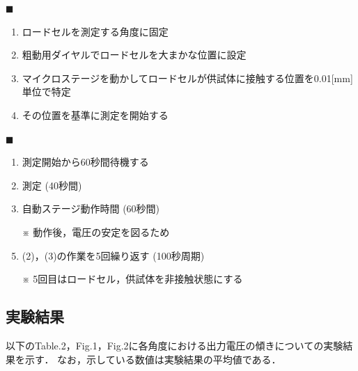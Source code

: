 \documentclass[twocolumn,a4j]{jsarticle}
\begin{document}
$\blacksquare$ 
\begin{enumerate}[(1)]
    \item ロードセルを測定する角度に固定
    \item 粗動用ダイヤルでロードセルを大まかな位置に設定
    \item マイクロステージを動かしてロードセルが供試体に接触する位置を0.01[mm]単位で特定
    \item その位置を基準に測定を開始する
\end{enumerate}

$\blacksquare$ 
\begin{enumerate}[(1)]
    \item 測定開始から60秒間待機する
    \item 測定 (40秒間)
    \item 自動ステージ動作時間 (60秒間)
    \item [※] 動作後，電圧の安定を図るため
    \item (2)，(3)の作業を5回繰り返す (100秒周期)
    \item [※] 5回目はロードセル，供試体を非接触状態にする
\end{enumerate}

\subsection{実験結果}

以下のTable.2，Fig.1，Fig.2に各角度における出力電圧の傾きについての実験結果を示す．
なお，示している数値は実験結果の平均値である．
\end{document}
